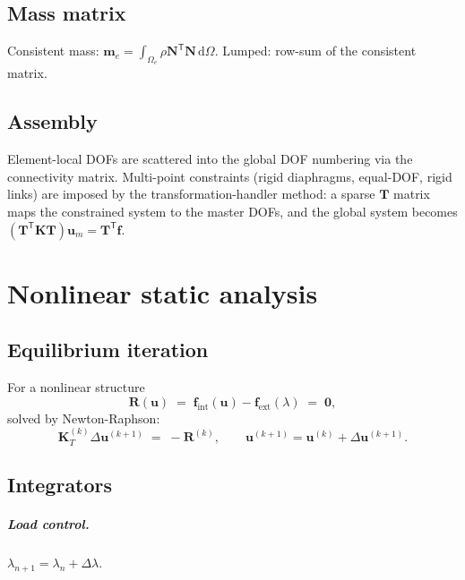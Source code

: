 \documentclass[11pt,a4paper]{report}
\newcommand{\bs}[1]{\boldsymbol{#1}}
\begin{document}
\section{Mass matrix}

Consistent mass: $\bs m_e = \int_{\Omega_e} \rho \bs N^{\mathsf T}
\bs N \, \mathrm{d}\Omega$.  Lumped: row-sum of the consistent
matrix.

\section{Assembly}

Element-local DOFs are scattered into the global DOF numbering via
the connectivity matrix.  Multi-point constraints (rigid diaphragms,
equal-DOF, rigid links) are imposed by the transformation-handler
method: a sparse $\bs T$ matrix maps the constrained system to the
master DOFs, and the global system becomes $(\bs T^{\mathsf T} \bs K
\bs T) \bs u_m = \bs T^{\mathsf T} \bs f$.

\chapter{Nonlinear static analysis}
\label{ch:nonlinear}

\section{Equilibrium iteration}

For a nonlinear structure
\begin{equation}
  \bs R(\bs u) \;=\; \bs f_{\mathrm{int}}(\bs u) - \bs f_{\mathrm{ext}}(\lambda) \;=\; \bs 0,
\end{equation}
solved by Newton-Raphson:
\begin{equation}
  \bs K_T^{(k)} \Delta \bs u^{(k+1)} \;=\; - \bs R^{(k)}, \qquad
  \bs u^{(k+1)} = \bs u^{(k)} + \Delta \bs u^{(k+1)}.
\end{equation}

\section{Integrators}

\paragraph{Load control.}  $\lambda_{n+1} = \lambda_n + \Delta\lambda$.
\end{document}
